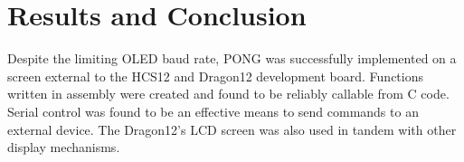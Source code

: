 \chapter{Results and Conclusion} 

Despite the limiting OLED baud rate, PONG was successfully implemented on a screen external to the HCS12 and Dragon12 development board.
Functions written in assembly were created and found to be reliably callable from C code.
Serial control was found to be an effective means to send commands to an external device.
The Dragon12's LCD screen was also used in tandem with other display mechanisms.